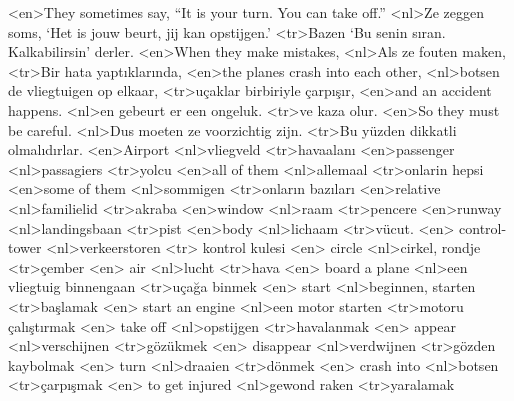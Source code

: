 <en>They sometimes say, “It is your turn. You can take off.”
<nl>Ze zeggen soms, `Het is jouw beurt, jij kan opstijgen.'
<tr>Bazen ‘Bu senin sıran. Kalkabilirsin’ derler.
<en>When they make mistakes,
<nl>Als ze fouten maken, 
<tr>Bir hata yaptıklarında,
<en>the planes crash into each other,
<nl>botsen de vliegtuigen op elkaar,
<tr>uçaklar birbiriyle çarpışır,
<en>and an accident happens.
<nl>en gebeurt er een ongeluk.
<tr>ve kaza olur.
<en>So they must be careful.
<nl>Dus moeten ze voorzichtig zijn.
<tr>Bu yüzden dikkatli olmalıdırlar.
<en>Airport
<nl>vliegveld
<tr>havaalanı
<en>passenger
<nl>passagiers
<tr>yolcu
<en>all of them
<nl>allemaal
<tr>onlarin hepsi
<en>some of them 
<nl>sommigen  
<tr>onların bazıları
<en>relative  
<nl>familielid  
<tr>akraba
<en>window  
<nl>raam  
<tr>pencere
<en>runway  
<nl>landingsbaan  
<tr>pist
<en>body 
<nl>lichaam  
<tr>vücut.
<en> control-tower  
<nl>verkeerstoren 
<tr> kontrol kulesi
<en> circle 
<nl>cirkel, rondje 
<tr>çember
<en> air 
<nl>lucht 
<tr>hava
<en> board a plane  
<nl>een vliegtuig binnengaan 
<tr>uçağa binmek
<en> start 
<nl>beginnen, starten 
<tr>başlamak
<en> start an engine 
<nl>een motor starten 
<tr>motoru çalıştırmak
<en> take off 
<nl>opstijgen 
<tr>havalanmak
<en> appear 
<nl>verschijnen 
<tr>gözükmek
<en> disappear 
<nl>verdwijnen 
<tr>gözden kaybolmak
<en> turn 
<nl>draaien 
<tr>dönmek
<en> crash into 
<nl>botsen 
<tr>çarpışmak
<en> to get injured 
<nl>gewond raken 
<tr>yaralamak
